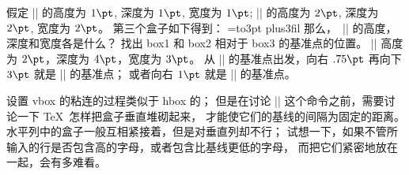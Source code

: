 \dangerexercise 假定 || 的高度为 $1\pt$, 深度为 $1\pt$, 宽度为 $1\pt$;
|| 的高度为 $2\pt$, 深度为 $2\pt$, 宽度为 $2\pt$。%
第三个盒子如下得到：
\begintt
{}=\hbox to3pt{\hfil{}\hskip-3pt plus3fil}
\endtt
那么，~|| 的高度，深度和宽度各是什么？
找出 box1 和 box2 相对于 box3 的基准点的位置。
\answer \1|| 高度为 $2\pt$，深度为 $4\pt$，宽度为 $3\pt$。
从 || 的基准点出发，向右 $.75\pt$ 再向下 $3\pt$ 就是 || 的基准点；
或者向右 $1\pt$ 就是 || 的基准点。

\danger \1设置 vbox 的粘连的过程类似于 hbox 的；
但是在讨论 |\vbox| 这个命令之前，需要讨论一下 \TeX\ 怎样把盒子垂直堆砌起来，
才能使它们的基线的间隔为固定的距离。%
水平列中的盒子一般互相紧接着，但是对垂直列却不行；
试想一下，如果不管所输入的行是否包含高的字母，或者包含比基线更低的字母，
而把它们紧密地放在一起，会有多难看。

